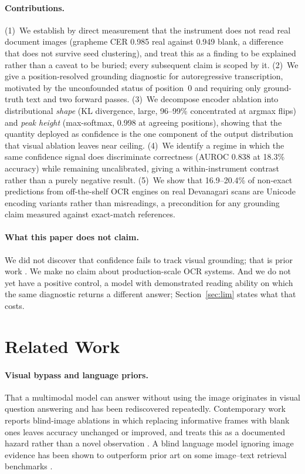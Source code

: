 \documentclass{article}
\begin{document}
\paragraph{Contributions.}
(1)~We establish by direct measurement that the instrument does not read real document images
(grapheme CER 0.985 real against 0.949 blank, a difference that does not survive seed
clustering), and treat this as a finding to be explained rather than a caveat to be buried;
every subsequent claim is scoped by it.
(2)~We give a position-resolved grounding diagnostic for autoregressive transcription,
motivated by the unconfounded status of position~0 and requiring only ground-truth text and
two forward passes.
(3)~We decompose encoder ablation into distributional \emph{shape} (KL divergence, large,
96--99\% concentrated at argmax flips) and \emph{peak height} (max-softmax, 0.998 at agreeing
positions), showing that the quantity deployed as confidence is the one component of the
output distribution that visual ablation leaves near ceiling.
(4)~We identify a regime in which the same confidence signal does discriminate correctness
(AUROC 0.838 at 18.3\% accuracy) while remaining uncalibrated, giving a within-instrument
contrast rather than a purely negative result.
(5)~We show that 16.9--20.4\% of non-exact predictions from off-the-shelf OCR engines on real
Devanagari scans are Unicode encoding variants rather than misreadings, a precondition for any
grounding claim measured against exact-match references.

\paragraph{What this paper does not claim.} We did not discover that confidence fails to track
visual grounding; that is prior work \citep{khanmohammadi2026bicr}. We make no claim about
production-scale OCR systems. And we do not yet have a positive control, a model with
demonstrated reading ability on which the same diagnostic returns a different answer;
Section~\ref{sec:lim} states what that costs.

\section{Related Work}

\paragraph{Visual bypass and language priors.} That a multimodal model can answer without
using the image originates in visual question answering and has been rediscovered repeatedly.
Contemporary work reports blind-image ablations in which replacing informative frames with
blank ones leaves accuracy unchanged or improved, and treats this as a documented hazard
rather than a novel observation \citep{videoworldmodels2026}. A blind language model ignoring
image evidence has been shown to outperform prior art on some image--text retrieval benchmarks
\citep{lin2024visualgptscore}.
\end{document}
